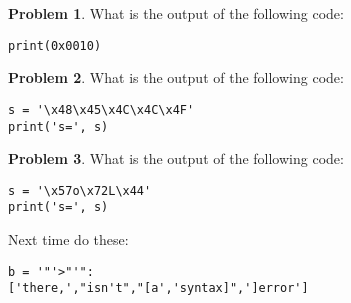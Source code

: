 \documentclass[10pt]{article}
\theoremstyle{definition}
\newtheorem{problem}{Problem}
\newcommand{\x}{\mathbf x}
\begin{document}
\begin{problem}
    What is the output of the following code:
\end{problem}
\begin{lstlisting}
print(0x0010)
\end{lstlisting}
\vspace{1.5in}

\begin{problem}
    What is the output of the following code:
\end{problem}
\begin{lstlisting}
s = '\x48\x45\x4C\x4C\x4F'
print('s=', s)
\end{lstlisting}
\vspace{1.5in}

\begin{problem}
    What is the output of the following code:
\end{problem}
\begin{lstlisting}
s = '\x57o\x72L\x44'
print('s=', s)
\end{lstlisting}
\vspace{1.5in}

Next time do these:
\begin{lstlisting}
b = '"'>"'":
['there,',"isn't","[a','syntax]",']error']
\end{lstlisting}
\end{document}
